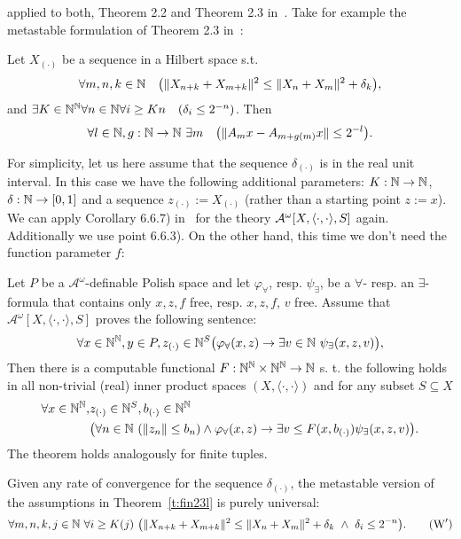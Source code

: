 applied to both, Theorem 2.2 and Theorem 2.3 in~\cite{Wittmann90}. Take for example the metastable 
formulation of Theorem 2.3 in~\cite{Wittmann90}:
\begin{thm}\label{t:fin23l}
Let $X_{(\cdot)}$ be a sequence in a Hilbert space s.t. 
\[
\forall m,n,k\in\NN\quad \big(\|X_{n+k}+X_{m+k}\|^2 \leq \|X_{n}+X_{m}\|^2 + \delta_k\big), %
\] and $\exists K\in\mathbb{N}^{\mathbb{N}}\forall n\in\mathbb{N} \forall i\geq Kn\quad (\delta_i\leq 2^{-n})$.
Then
\[
\forall l\in\mathbb{N}, g:\mathbb{N}\to\mathbb{N}\ \exists m\quad \big( \|A_mx-A_{m+g(m)}x\|\leq 2^{-l} \big).
\]
\end{thm}
For simplicity, let us
here assume that the sequence $\delta_{(\cdot)}$ is in the real unit interval.
In this case we have the following additional parameters: $K:\mathbb{N}\to\mathbb{N}$, $\delta:\mathbb{N}\to[0,1]$ and
a sequence $z_{(\cdot)}:=X_{(\cdot)}$ (rather than a starting point $z:=x$). 
We can apply Corollary 6.6.7) in~\cite{GK08} for the theory $\mathcal{A}^\omega[X,\langle\cdot,\cdot\rangle,S]$ again. 
Additionally we use point 6.6.3). On the other hand,
this time we don't need the function parameter $f$:
\begin{thm}\label{t:GKmeta2}
Let $P$ be a $\mathcal{A}^\omega$-definable Polish space and let $\varphi_\forall$, resp. $\psi_\exists$, be a $\forall$-
resp. an $\exists$-formula that contains only $x,z,f$ free, resp. $x,z,f$, $v$ free. Assume that
$\mathcal{A}^\omega[X,\langle\cdot,\cdot\rangle,S]$ proves the following sentence:
\[
\forall  x\in\mathbb{N}^{\mathbb{N}}, y\in P,z_{(\cdot)}\in\mathbb{N}^S 
	\big( \varphi_\forall(x, z)\rightarrow\exists v\in\mathbb{N}\ \psi_\exists(x, z, v)\big),
\]
Then there is a computable functional $F : \mathbb{N}^{\mathbb{N}}\times \mathbb{N}^{\mathbb{N}}\to \mathbb{N}$ s. t. the following holds
in all non-trivial (real) inner product spaces $(X,\langle\cdot,\cdot\rangle)$ and for any subset $S\subseteq X$
\begin{align*}
\forall  x\in\mathbb{N}^{\mathbb{N}}, &z_{(\cdot)}\in\mathbb{N}^S, b_{(\cdot)}\in\mathbb{N}^{\mathbb{N}} \\
	&\big( \forall n\in\mathbb{N}\ ( \|z_n\|\leq b_n)\wedge\varphi_\forall(x, z) \rightarrow
	\exists v\leq F(x,b_{(\cdot)})\psi_\exists(x, z, v)\big).
\end{align*}
The theorem holds analogously for finite tuples.
\end{thm}
Given any rate of convergence for the sequence $\delta_{(\cdot)}$, the metastable version of the assumptions 
in Theorem~\ref{t:fin23l} is purely universal:
\begin{align*}
\forall m,n,k,j\in\NN\ \forall i\geq K(j) 
 \ \big( \|X_{n+k}+X_{m+k}\|^2 \leq \|X_{n}+X_{m}\|^2 + \delta_k\ \wedge\ \delta_i\leq 2^{-n} \big). \tag{$\TAN'$}
\end{align*}
